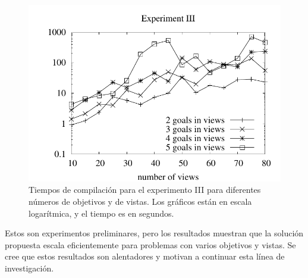 \begin{figure}[t]
\centering
\includegraphics[width=.8\textwidth]{graphics/plot3}
\caption{Tiempos de compilación para el experimento III para diferentes números
de objetivos y de vistas. Los gráficos están en escala logarítmica, y el
tiempo es en segundos.}
\label{fig:plot3}
\end{figure}

Estos son experimentos preliminares, pero los resultados muestran que la
solución propuesta escala eficientemente para problemas con varios objetivos
y vistas. Se cree que estos resultados son alentadores y motivan a continuar
esta línea de investigación.
